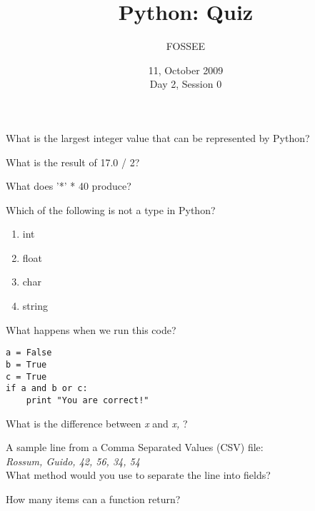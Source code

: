 \documentclass[14pt,compress]{beamer}
\title[Basic Python]{Python: Quiz}
\author[FOSSEE Team] {FOSSEE}
\institute[IIT Bombay] {Department of Aerospace Engineering\\IIT Bombay}
\date[] {11, October 2009\\Day 2, Session 0}
\newcommand{\kwrd}[1]{ \texttt{\textbf{\color{blue}{#1}}}  }
\begin{document}
\begin{frame}
  \titlepage
\end{frame}

\begin{frame}{}
  What is the largest integer value that can be represented by Python?
\end{frame}

\begin{frame}{}
  What is the result of 17.0 / 2?
\end{frame}

\begin{frame}{}
  What does '*' * 40 produce?
\end{frame}

\begin{frame}{}
  Which of the following is not a type in Python?
  \begin{enumerate}
    \item int
    \item float
    \item char
    \item string
  \end{enumerate}
\end{frame}

\begin{frame}[fragile]{}
  What happens when we run this code?
  \begin{lstlisting}
a = False
b = True
c = True
if a and b or c:
    print "You are correct!"
  \end{lstlisting}
\end{frame}

\begin{frame}{}
  What is the difference between \kwrd{print} \emph{x} and \kwrd{print} \emph{x,} ?
\end{frame}

\begin{frame}{}
  A sample line from a Comma Separated Values (CSV) file:\\
  \vspace*{0.2in}
  \emph{Rossum, Guido, 42, 56, 34, 54}\\
  \vspace*{0.2in}
  What method would you use to separate the line into fields?
\end{frame}

\begin{frame}{}
  How many items can a function return?
\end{frame}
\end{document}
